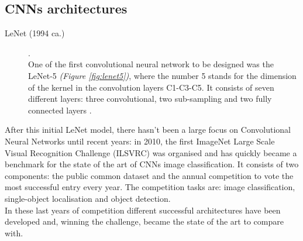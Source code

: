 \documentclass[../main.tex]{subfiles}
\begin{document}
\vspace{5mm}
\subsection{CNNs architectures}

\begin{description}
\item[LeNet (1994 ca.)] \cite{LeCun1998}. \hfill \\
One of the first convolutional neural network to be designed was the LeNet-5 \textit{(Figure \ref{fig:lenet5})}, where the number 5 stands for the dimension of the kernel in the convolution layers C1-C3-C5. It consists of seven different layers: three convolutional, two sub-sampling and two fully connected layers \cite{LeCun1998}. 
\end{description}



After this initial LeNet model, there hasn't been a large focus on Convolutional Neural Networks until recent years: in 2010, the first ImageNet Large Scale Visual Recognition Challenge (ILSVRC) was organised \cite{Russakovsky} and has quickly became a benchmark for the state of the art of CNNs image classification. It consists of two components: the public common dataset and the annual competition to vote the most successful entry every year. The competition tasks are: image classification, single-object localisation and object detection. \cite{Russakovsky} \\
In these last years of competition different successful architectures have been developed and, winning the challenge, became the state of the art to compare with.
\clearpage
\newpage
\end{document}
